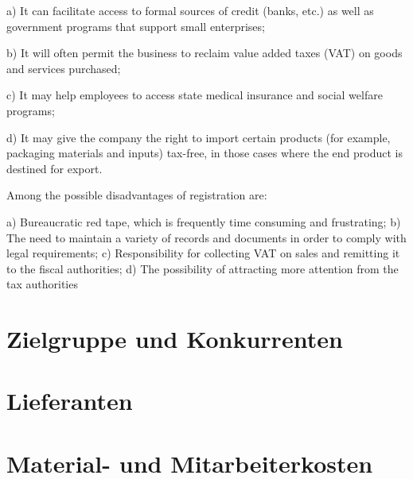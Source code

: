 a) It can facilitate access to formal sources of credit (banks, etc.) as well as government programs that support small enterprises;

b) It will often permit the business to reclaim value added taxes (VAT) on goods and services purchased;

c) It may help employees to access state medical insurance and social welfare programs;

d) It may give the company the right to import certain products (for example, packaging materials and inputs) tax-free, in those cases where the end product is destined for export.

Among the possible disadvantages of registration are:

a) Bureaucratic red tape, which is frequently time consuming and frustrating;
b) The need to maintain a variety of records and documents in order to comply with legal requirements;
c) Responsibility for collecting VAT on sales and remitting it to the fiscal authorities;
d) The possibility of attracting more attention from the tax authorities

\section{Zielgruppe und Konkurrenten}

\section{Lieferanten}

\section{Material- und Mitarbeiterkosten}

